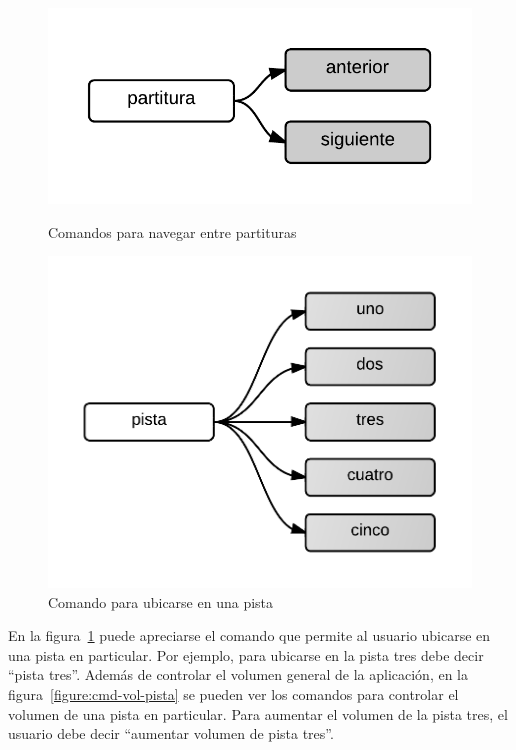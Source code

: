 \begin{figure}[H]
\begin{minipage}[b]{0.5\linewidth}
\centering
\includegraphics[width=0.6\linewidth]{./graphics/partitura-2.png}
\caption{Comandos para navegar entre partituras}
\label{figure:cmd-partitura-2}
\end{minipage}
\quad
\begin{minipage}[b]{0.5\linewidth}
\centering
\includegraphics[width=0.6\linewidth]{./graphics/cmd-pista-1.png}
\caption{Comando para ubicarse en una pista}
\label{figure:cmd-pista-1}
\end{minipage}
\end{figure} 

En la figura~\ref{figure:cmd-pista-1} puede apreciarse el comando que permite al usuario ubicarse en una pista en particular. Por  
ejemplo, para ubicarse en la pista tres debe decir “pista tres”. Adem\'as de controlar el volumen general de la aplicaci\'on, en 
la figura~\ref{figure:cmd-vol-pista} se pueden ver los comandos para controlar el volumen de una pista en particular. Para aumentar
el volumen de la pista tres, el usuario debe decir ``aumentar volumen de pista tres''.

